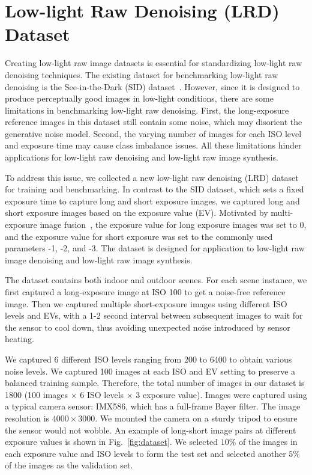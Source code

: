 \documentclass[10pt,twocolumn,letterpaper]{article}
\begin{document}
\section{Low-light Raw Denoising (LRD) Dataset}
Creating low-light raw image datasets is essential for standardizing low-light raw denoising techniques. The existing dataset for benchmarking low-light raw denoising is the See-in-the-Dark (SID) dataset~\cite{chen2018learning}. However, since it is designed to produce perceptually good images in low-light conditions, there are some limitations in benchmarking low-light raw denoising. First, the long-exposure reference images in this dataset still contain some noise, which may disorient the generative noise model. Second, the varying number of images for each ISO level and exposure time may cause class imbalance issues. All these limitations hinder applications for low-light raw denoising and low-light raw image synthesis.

To address this issue, we collected a new low-light raw denoising (LRD) dataset for training and benchmarking. In contrast to the SID dataset, which sets a fixed exposure time to capture long and short exposure images, we captured long and short exposure images based on the exposure value (EV). Motivated by multi-exposure image fusion~\cite{ma2015perceptual, ma2019deep}, the exposure value for long exposure images was set to 0, and the exposure value for short exposure was set to the commonly used parameters -1, -2, and -3. The dataset is designed for application to low-light raw image denoising and low-light raw image synthesis.

The dataset contains both indoor and outdoor scenes. For each scene instance, we first captured a long-exposure image at ISO 100 to get a noise-free reference image. Then we captured multiple short-exposure images using different ISO levels and EVs, with a 1-2 second interval between subsequent images to wait for the sensor to cool down, thus avoiding unexpected noise introduced by sensor heating.

We captured 6 different ISO levels ranging from 200 to 6400 to obtain various noise levels. We captured 100 images at each ISO and EV setting to preserve a balanced training sample. Therefore, the total number of images in our dataset is 1800 (100 images $\times$ 6 ISO levels $\times$ 3 exposure value). Images were captured using a typical camera sensor: IMX586, which has a full-frame Bayer filter. The image resolution is $4000\times3000$. We mounted the camera on a sturdy tripod to ensure the sensor would not wobble. An example of long-short image pairs at different exposure values is shown in Fig.~\ref{fig:dataset}. We selected $10\%$ of the images in each exposure value and ISO levels to form the test set and selected another $5\%$ of the images as the validation set.
\end{document}
